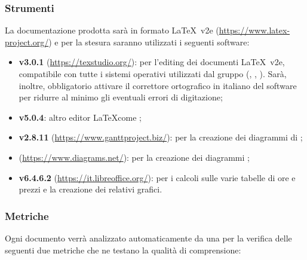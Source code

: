 	\subsubsection{Strumenti}
	La documentazione prodotta sarà in formato \LaTeX\ v2e (\url{https://www.latex-project.org/}) e per la stesura saranno utilizzati i seguenti software:	
	\begin{itemize}
		\item \textbf{ v3.0.1} (\url{https://texstudio.org/}): per l'editing dei documenti \LaTeX\ v2e, compatibile con tutte i sistemi operativi utilizzati dal gruppo (, , ). Sarà, inoltre, obbligatorio attivare il correttore ortografico in italiano del software per ridurre al minimo gli eventuali errori di digitazione;
		\item \textbf{ v5.0.4}: altro editor \LaTeX come ;
		\item \textbf{ v2.8.11} (\url{https://www.ganttproject.biz/}): per la creazione dei diagrammi di ;
		\item \textbf{} (\url{https://www.diagrams.net/}): per la creazione dei diagrammi ;
		\item \textbf{ v6.4.6.2} (\url{https://it.libreoffice.org/}): per i calcoli sulle varie tabelle di ore  e prezzi e la creazione dei relativi grafici.
	\end{itemize}
	
	\subsubsection{Metriche}
	Ogni documento verrà analizzato automaticamente da una  per la verifica delle seguenti due metriche che ne testano la qualità di comprensione:

